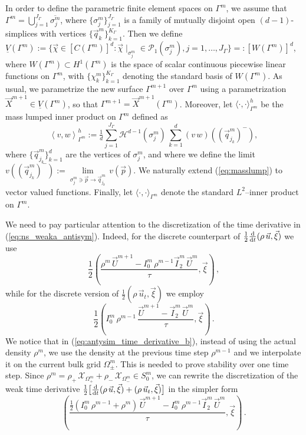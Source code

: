 \documentclass[a4paper,12pt,onecolumn]{article}
\newcommand{\surfvol}{\mathcal{H}^{d-1}}
\newcommand{\bigchi}{\ensuremath{\mathrm{\mathcal{X}}}}
\newcommand{\charfcn}[1]{\bigchi_{#1}} %
\newcommand{\Vh}{\underline{V}(\Gamma^m)}
\newcommand{\Wh}{W(\Gamma^m)}
\newcommand{\ddt}{\frac{\rm d}{{\rm d}t}}
\begin{document}
In order to define the parametric finite element spaces on $\Gamma^m$, we
assume that $\Gamma^m=\bigcup_{j=1}^{J_\Gamma} \overline{\sigma^m_j}$, where
$\{\sigma^m_j\}_{j=1}^{J_\Gamma}$ is a family of mutually disjoint open
$(d-1)$-simplices with vertices $\{\vec q^m_k\}_{k=1}^{K_\Gamma}$. Then
we define $\Vh := \{\vec\chi \in [C(\Gamma^m)]^d:\vec\chi\!\mid_{\sigma^m_j}
\in \mathcal{P}_1(\sigma^m_j), j=1,\ldots, J_\Gamma\} =: [\Wh]^d$, where $\Wh
\subset H^1(\Gamma^m)$ is the space of scalar continuous piecewise linear
functions on $\Gamma^m$, with $\{\chi^m_k\}_{k=1}^{K_\Gamma}$ denoting the
standard basis of $\Wh$. As usual, we parametrize the new surface
$\Gamma^{m+1}$ over $\Gamma^m$ using a parametrization $\vec X^{m+1} \in \Vh$,
so that $\Gamma^{m+1} = \vec X^{m+1}(\Gamma^m)$. Moreover, let
$\langle\cdot,\cdot\rangle_{\Gamma^m}^h$ be the mass lumped inner product on
$\Gamma^m$ defined as
\begin{equation} \label{eq:masslump}
\left\langle v, w \right\rangle^h_{\Gamma^m} :=
\tfrac1d \sum_{j=1}^{J_\Gamma} \surfvol(\sigma^m_j)\,
\sum_{k=1}^d (v\,w)((\vec q^m_{j_k})^-),
\end{equation}
where $\{\vec q^m_{j_k}\}_{k=1}^d$ are the vertices of $\sigma^m_j$, and
where we define the limit $v((\vec q^m_{j_k})^-)
:= \underset{\sigma^m_j\ni \vec p\to \vec q^m_{j_k}}{\lim}\, v(\vec p)$. We
naturally extend (\ref{eq:masslump}) to vector valued functions. Finally, let
$\langle\cdot,\cdot\rangle_{\Gamma^m}$ denote the standard $L^2$--inner product
on $\Gamma^m$.

We need to pay particular attention to the discretization of the time
derivative in (\ref{eq:ns_weaka_antisym}). Indeed, for the discrete counterpart
of $\tfrac{1}{2} \ddt (\rho\,\vec u, \vec \xi)$ we use
\begin{equation}\label{eq:antysim_time_derivative_a}
\frac{1}{2}\left(\frac{\rho^m\,\vec U^{m+1} - I^m_0\,\rho^{m-1}
\vec I^m_2\,\vec U^m}{\tau}, \vec \xi \right)\,,
\end{equation}
while for the discrete version of $\tfrac{1}{2}(\rho\,\vec u_t, \vec \xi)$
we employ
\begin{equation}\label{eq:antysim_time_derivative_b}
\frac{1}{2}\left( I^m_0\,\rho^{m-1}\, \frac{\vec U^{m+1} - \vec I^m_2\,
\vec U^m}{\tau}, \vec \xi \right)\,.
\end{equation}
We notice that in (\ref{eq:antysim_time_derivative_b}), instead of using the
actual density $\rho^m$, we use the density at the previous time step
$\rho^{m-1}$ and we interpolate it on the current bulk grid $\Omega_\pm^m$. This
is needed to prove stability over one time step. Since
$\rho^m = \rho_+\,\charfcn{\Omega^m_+} + \rho_-\,\charfcn{\Omega^m_-}\in
S^m_0$, we can rewrite the discretization of the weak time derivative
$\tfrac{1}{2}\big[ \ddt (\rho\,\vec u, \vec \xi)+(\rho\,\vec u_t, \vec\xi)\big]$
in the simpler form
\begin{equation}
\left(\frac{\tfrac{1}{2}(I^m_0\,\rho^{m-1}+\rho^m)\,\vec U^{m+1} -
I^m_0\,\rho^{m-1} \vec I^m_2\,\vec U^m}{\tau}, \vec \xi \right)\,.
\end{equation}
\end{document}
